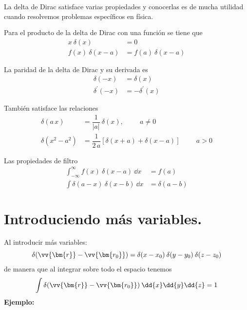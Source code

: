 La delta de Dirac satisface varias propiedades y conocerlas es de mucha utilidad cuando resolvemos problemas específicos en física. 
\par
\begin{propiedad}
Para el producto de la delta de Dirac con una función se tiene que
\begin{align}
x \: \delta(x) &= 0 \\
f(x) \: \delta(x - a) &= f(a) \: \delta(x - a)
\end{align}
\end{propiedad}
\begin{propiedad}
La paridad de la delta de Dirac y su derivada es
\begin{align}
\delta (-x) &= \delta (x) \\
\delta^{\prime} (-x) &= - \delta^{\prime} (x)
\end{align}
\end{propiedad}
\begin{propiedad}
También satisface las relaciones
\begin{align}
\delta(a \, x) &= \dfrac{1}{\vert a \vert} \: \delta (x), \hspace{1cm} a \neq 0 \\
\delta (x^{2} - a^{2}) &= \dfrac{1}{2 \, a} \left[ \delta (x + a) + \delta (x - a) \right] \hspace{1cm} a > 0
\end{align}
\end{propiedad}
\begin{propiedad}
Las propiedades de filtro
\begin{align}
\int_{-\infty}^{\infty} f(x) \: \delta (x - a) \: \dd{x} &= f(a) \\
\int \delta (a - x) \: \delta (x - b) \: \dd{x} &= \delta (a - b)
\end{align}
\end{propiedad}
\section{Introduciendo más variables.}
Al introducir más variables:
\begin{equation}
\delta (\vv{\bm{r}} - \vv{\bm{r_{0}}}) = \delta (x - x_{0}) \: \delta (y - y_{0}) \: \delta (z - z_{0})
\label{eq:ecuacion_A_03}
\end{equation}
de manera que al integrar sobre todo el espacio tenemos
\[ \int \delta (\vv{\bm{r}} - \vv{\bm{r_{0}}}) \: \dd{x} \dd{y}  \dd{z} = 1 \]
\textbf{Ejemplo:}

